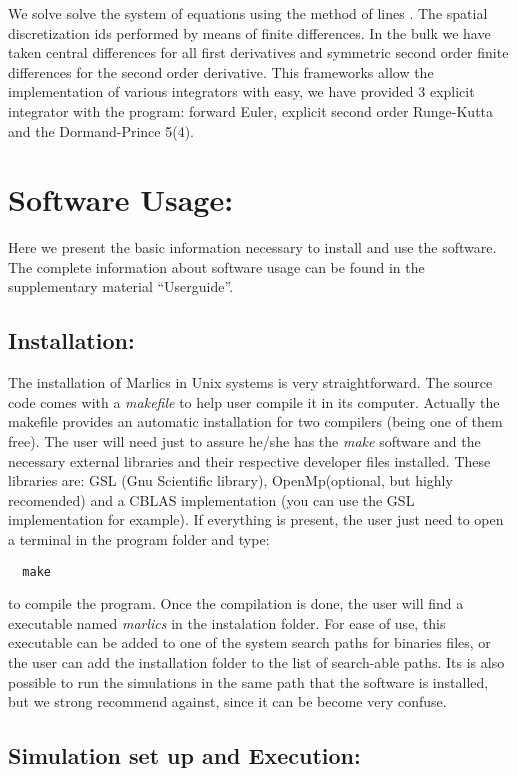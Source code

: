\documentclass[final,5p,times,twocolumn]{elsarticle}
\begin{document}
We solve solve the system of equations using the method of lines
\cite{}. The spatial discretization ids performed by means of finite
differences. In the bulk we have taken central differences for all
first derivatives and symmetric second order finite differences for
the second order derivative. This frameworks allow the implementation
of various integrators with easy, we have provided 3 explicit
integrator with the program: forward Euler, explicit second order
Runge-Kutta and the Dormand-Prince 5(4).

\section{Software Usage:} \label{sec:software_usage}

Here we present the basic information necessary to install and use the
software. The complete information about software usage can be found
in the supplementary material ``Userguide''.

\subsection{Installation:}

The installation of Marlics in Unix systems is very
straightforward. The source code comes with a \textit{makefile} to
help user compile it in its computer. Actually the makefile provides
an automatic installation for two compilers (being one of them free).
The user will need just to assure he/she has the \textit{make}
software and the necessary external libraries and their respective
developer files installed. These libraries are: GSL (Gnu Scientific
library), OpenMp(optional, but highly recomended) and a CBLAS
implementation (you can use the GSL implementation for example). If
everything is present, the user just need to open a terminal in the
program folder and type:
\begin{lstlisting}
  make
\end{lstlisting}
to compile the program. Once the compilation is done, the user will
find a executable named \textit{marlics} in the instalation
folder. For ease of use, this executable can be added to one of the
system search paths for binaries files, or the user can add the
installation folder to the list of search-able paths. Its is also
possible to run the simulations in the same path that the software is
installed, but we strong recommend against, since it can be become
very confuse.

\subsection{Simulation set up and Execution:}
\end{document}
